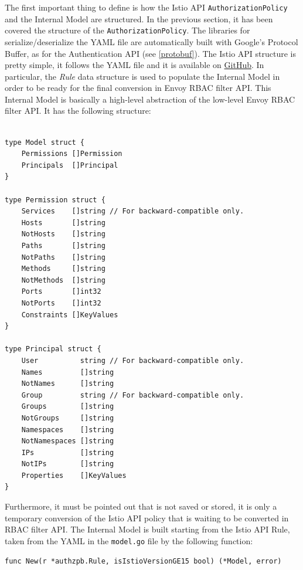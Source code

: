 The first important thing to define is how the Istio API \texttt{AuthorizationPolicy} and the Internal Model are structured.
In the previous section, it has been covered the structure of the \texttt{AuthorizationPolicy}. The libraries for serialize/deserialize the YAML file are automatically built with Google's Protocol Buffer, as for the Authentication API (see \ref{protobuf}). The Istio API structure is pretty simple, it follows the YAML file and it is available on \href{https://github.com/istio/api/blob/release-1.6/security/v1beta1/authorization.proto}{GitHub}. In particular, the \textit{Rule} data structure is used to populate the Internal Model in order to be ready for the final conversion in Envoy RBAC filter API. This Internal Model is basically a high-level abstraction of the low-level Envoy RBAC filter API. It has the following structure:

\begin{lstlisting}

type Model struct {
	Permissions []Permission
	Principals  []Principal
}

type Permission struct {
	Services    []string // For backward-compatible only.
	Hosts       []string
	NotHosts    []string
	Paths       []string
	NotPaths    []string
	Methods     []string
	NotMethods  []string
	Ports       []int32
	NotPorts    []int32
	Constraints []KeyValues
}

type Principal struct {
	User          string // For backward-compatible only.
	Names         []string
	NotNames      []string
	Group         string // For backward-compatible only.
	Groups        []string
	NotGroups     []string
	Namespaces    []string
	NotNamespaces []string
	IPs           []string
	NotIPs        []string
	Properties    []KeyValues
}
\end{lstlisting}

\noindent Furthermore, it must be pointed out that is not saved or stored, it is only a temporary conversion of the Istio API policy that is waiting to be converted in RBAC filter API.
The Internal Model is built starting from the Istio API Rule, taken from the YAML in the \texttt{model.go} file by the following function:

\begin{lstlisting}[title=\href{https://github.com/istio/istio/blob/4e6e7f49375d84bb35ee614c6b7d38b6c2fd3e7b/pilot/pkg/security/authz/model/model.go\#L80-L148}{GitHub permalink}]
func New(r *authzpb.Rule, isIstioVersionGE15 bool) (*Model, error)
\end{lstlisting}

